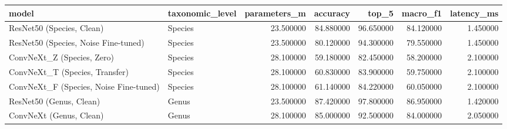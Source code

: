 \begin{tabular}{llrrrrr}
\toprule
model & taxonomic_level & parameters_m & accuracy & top_5 & macro_f1 & latency_ms \\
\midrule
ResNet50 (Species, Clean) & Species & 23.500000 & 84.880000 & 96.650000 & 84.120000 & 1.450000 \\
ResNet50 (Species, Noise Fine-tuned) & Species & 23.500000 & 80.120000 & 94.300000 & 79.550000 & 1.450000 \\
ConvNeXt_Z (Species, Zero) & Species & 28.100000 & 59.180000 & 82.450000 & 58.200000 & 2.100000 \\
ConvNeXt_T (Species, Transfer) & Species & 28.100000 & 60.830000 & 83.900000 & 59.750000 & 2.100000 \\
ConvNeXt_F (Species, Noise Fine-tuned) & Species & 28.100000 & 61.140000 & 84.220000 & 60.050000 & 2.100000 \\
ResNet50 (Genus, Clean) & Genus & 23.500000 & 87.420000 & 97.800000 & 86.950000 & 1.420000 \\
ConvNeXt (Genus, Clean) & Genus & 28.100000 & 85.000000 & 92.500000 & 84.000000 & 2.050000 \\
\bottomrule
\end{tabular}

